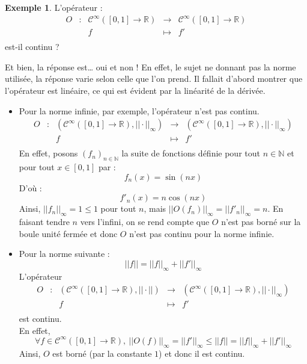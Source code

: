 \documentclass[a4paper,11pt]{article}
\theoremstyle{plain}
\theoremstyle{definition}
\newtheorem*{expl}{Exemple}
\begin{document}
\begin{expl}
L'opérateur :
\[\begin{array}{ccccc}
O & : & \mathcal{C}^{\infty}\left([0,1] \to \mathbb{R}\right) &\longrightarrow  & \mathcal{C}^{\infty}\left([0,1] \to \mathbb{R}\right)\\
	& & f &\longmapsto& f'\\
\end{array}\] est-il continu ?
\end{expl}
Et bien, la réponse est… oui et non !
En effet, le sujet ne donnant pas la norme utilisée, la réponse varie selon celle que l'on prend.
Il fallait d'abord montrer que l'opérateur est linéaire, ce qui est évident par la linéarité de la dérivée.
\begin{itemize}
\item Pour la norme infinie, par exemple, l'opérateur n'est pas continu.
\[\begin{array}{ccccc}
O & : & \left(\mathcal{C}^{\infty}\left([0,1] \to \mathbb{R}\right), ||\cdot||_{\infty}\right) &\longrightarrow  & \left(\mathcal{C}^{\infty}\left([0,1] \to \mathbb{R}\right), ||\cdot||_{\infty}\right)\\
	& & f &\longmapsto& f'\\
\end{array}\] 
En effet, posons $(f_n)_{n \in \mathbb{N}}$ la suite de fonctions définie pour tout $n \in \mathbb{N}$ et pour tout $x \in [0,1]$ par :
\[
	f_{n}(x) = \sin(nx)
\]
D'où :
\[
	f'_{n}(x) = n\cos(nx)
\]
Ainsi, $||f_{n}||_{\infty} = 1 \leq 1$ pour tout $n$, mais $||O(f_{n})||_{\infty} = ||f'_{n}||_{\infty} = n$.
En faisant tendre $n$ vers l'infini, on se rend compte que $O$ n'est pas borné sur la boule unité fermée et donc $O$ n'est pas continu pour la norme infinie.
\item Pour la norme suivante :
\[
	||f|| = ||f||_{\infty} + ||f'||_{\infty}
\]
L'opérateur 
\[\begin{array}{ccccc}
O & : & \left(\mathcal{C}^{\infty}\left([0,1] \to \mathbb{R}\right), ||\cdot||\right) &\longrightarrow  & \left(\mathcal{C}^{\infty}\left([0,1] \to \mathbb{R}\right), ||\cdot||_{\infty}\right)\\
	& & f &\longmapsto& f'\\
\end{array}\] 
est continu.\\
En effet, 
\[
\forall f \in \mathcal{C}^{\infty}\left([0,1] \to \mathbb{R}\right), \ ||O(f)||_{\infty} = ||f'||_{\infty} \leq ||f|| = ||f||_{\infty} + ||f'||_{\infty}
\]
Ainsi, $O$ est borné (par la constante $1$) et donc il est continu.
\end{itemize}
\end{document}
